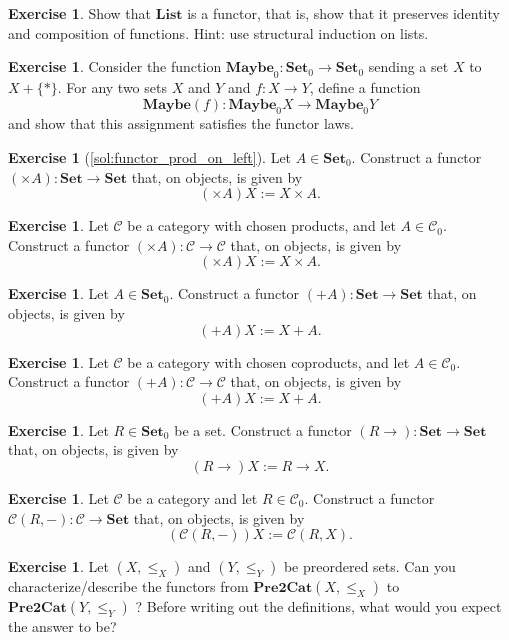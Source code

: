 \documentclass[a4paper,11pt, oneside,titlepage=false]{scrbook}
\theoremstyle{plain}
\theoremstyle{definition}
\newtheorem{exer}[thm]{Exercise}
\newcommand{\Cat}[1]{\mathcal{#1}}
\newcommand{\CC}{\Cat{C}}
\newcommand{\Catb}[1]{\mathbf{#1}}
\newcommand{\List}{\Catb{List}}
\newcommand{\Maybe}{\Catb{Maybe}}
\newcommand{\SET}{\Catb{Set}}
\newcommand{\PREtoCAT}{\Catb{Pre2Cat}}
\newcommand{\Ob}[1]{{#1}_0}
\newcommand{\CHom}[3]{{#1}(#2,#3)}
\begin{document}
\begin{exer}
  Show that $\List$ is a  functor, that is, show that it preserves identity and composition of functions.
  Hint: use structural induction on lists.
\end{exer}

\begin{exer}
  Consider the function $\Ob{\Maybe} : \Ob\SET \to \Ob\SET$ sending a set $X$ to $X + \{*\}$.
  For any two sets $X$ and $Y$ and $f : X \to Y$, define a function
  \[ \Maybe(f) : \Ob\Maybe X \to \Ob\Maybe Y\]
  and show that this assignment satisfies the functor laws.
\end{exer}

\begin{exer}[\cref{sol:functor_prod_on_left}]\label{exer:functor_prod_on_left}
  Let $A \in \Ob\SET$.
  Construct a functor $(\times A) : \SET \to \SET$ that, on objects, is given by
  \[ (\times A) X := X \times A. \]
\end{exer}


\begin{exer}
  Let $\CC$ be a category with chosen products, and let $A \in \Ob\CC$.
  Construct a functor $(\times A) : \CC \to \CC$ that, on objects, is given by
  \[ (\times A) X := X \times A. \]
\end{exer}

\begin{exer}
  Let $A \in \Ob\SET$.
  Construct a functor $(+ A) : \SET \to \SET$ that, on objects, is given by
  \[ (+ A) X := X + A. \]
\end{exer}

\begin{exer}
  Let $\CC$ be a category with chosen coproducts, and let $A \in \Ob\CC$.
  Construct a functor $(+ A) : \CC \to \CC$ that, on objects, is given by
  \[ (+ A) X := X + A. \]
\end{exer}

\begin{exer}
  Let $R \in \Ob\SET$ be a set.
  Construct a functor $(R \to) : \SET \to \SET$ that, on objects, is given by
  \[ (R \to) X := R \to X. \]
\end{exer}

\begin{exer}
  Let $\CC$ be a category and let $R \in \Ob\CC$.
  Construct a functor $\CHom \CC R - : \CC \to \SET$ that, on objects, is given by
  \[ (\CHom \CC R -) X := \CHom \CC R X. \]
\end{exer}


\begin{exer}\label{ex:poset_functors} Let $(X,\leq_X)$ and $(Y,\leq_Y)$ be preordered sets. Can you characterize/describe the functors from $\PREtoCAT(X,\leq_X)$ to $\PREtoCAT(Y,\leq_Y)$  ? Before writing out the definitions, what would you expect the answer to be?
\end{exer}
\end{document}
